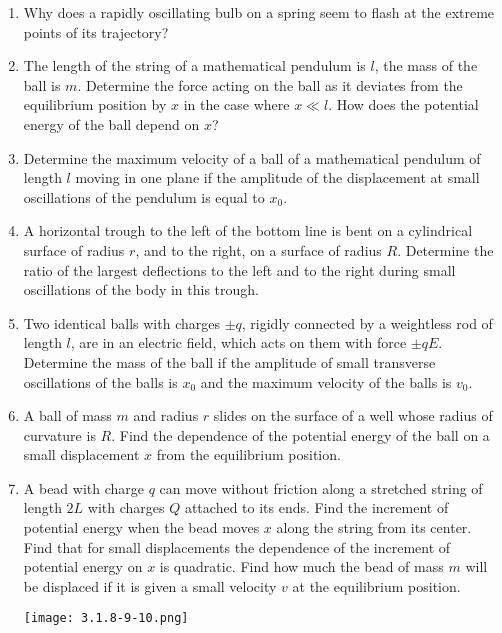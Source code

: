 \documentclass{article}
\begin{document}
\begin{enumerate}[label=3.1.\arabic*]
\item Why does a rapidly oscillating bulb on a spring seem to flash at the extreme points of its trajectory?

\item The length of the string of a mathematical pendulum is $l$, the mass of the ball is $m$. Determine the force acting on the ball as it deviates from the equilibrium position by $x$ in the case where $x \ll l$. How does the potential energy of the ball depend on $x$?

\item Determine the maximum velocity of a ball of a mathematical pendulum of length $l$ moving in one plane if the amplitude of the displacement at small oscillations of the pendulum is equal to $x_0$.

\item A horizontal trough to the left of the bottom line is bent on a cylindrical surface of radius $r$, and to the right, on a surface of radius $R$. Determine the ratio of the largest deflections to the left and to the right during small oscillations of the body in this trough.

\item Two identical balls with charges $\pm q$, rigidly connected by a weightless rod of length $l$, are in an electric field, which acts on them with force $\pm q E$. Determine the mass of the ball if the amplitude of small transverse oscillations of the balls is $x_0$ and the maximum velocity of the balls is $v_0$.

\item A ball of mass $m$ and radius $r$ slides on the surface of a well whose radius of curvature is $R$. Find the dependence of the potential energy of the ball on a small displacement $x$ from the equilibrium position.

\item A bead with charge $q$ can move without friction along a stretched string of length $2 L$ with charges $Q$ attached to its ends. Find the increment of potential energy when the bead moves $x$ along the string from its center. Find that for small displacements the dependence of the increment of potential energy on $x$ is quadratic. Find how much the bead of mass $m$ will be displaced if it is given a small velocity $v$ at the equilibrium position.

\begin{center}
    \texttt{[image: 3.1.8-9-10.png]}
\end{center}


\end{enumerate}
\end{document}
